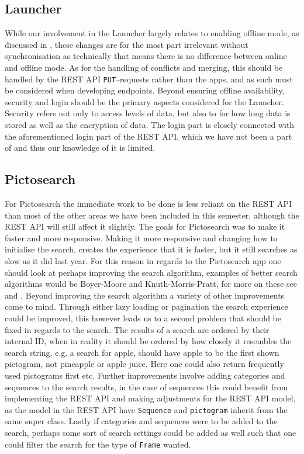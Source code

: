 \subsection*{Launcher}
While our involvement in the Launcher largely relates to enabling offline mode, as discussed in , these changes are for the most part irrelevant without synchronisation as technically that means there is no difference between online and offline mode.
As for the handling of conflicts and merging, this should be handled by the REST API \texttt{PUT}--requests rather than the apps, and as such must be considered when developing endpoints.
Beyond ensuring offline availability, security and login should be the primary aspects considered for the Launcher.
Security refers not only to access levels of data, but also to for how long data is stored as well as the encryption of data.
The login part is closely connected with the aforementioned login part of the REST API, which we have not been a part of and thus our knowledge of it is limited.

\subsection*{Pictosearch}
For Pictosearch the immediate work to be done is less reliant on the REST API than most of the other areas we have been included in this semester, although the REST API will still affect it slightly.
The goals for Pictosearch was to make it faster and more responsive.
Making it more responsive and changing how to initialise the search, creates the experience that it is faster, but it still searches as slow as it did last year.
For this reason in regards to the Pictosearch app one should look at perhaps improving the search algorithm, examples of better search algorithms would be Boyer-Moore and Knuth-Morris-Pratt, for more on these see \cite{BoyerMoore} and \cite{KnuthMorrisPratt}.
Beyond improving the search algorithm a variety of other improvements come to mind.
Through either lazy loading or pagination the search experience could be improved, this however leads us to a second problem that should be fixed in regards to the search.
The results of a search are ordered by their internal ID, when in reality it should be ordered by how closely it resembles the search string, e.g. a search for apple, should have apple to be the first shown pictogram, not pineapple or apple juice.
Here one could also return frequently used pictograms first etc.
Further improvements involve adding categories and sequences to the search results, in the case of sequences this could benefit from implementing the REST API and making adjustments for the REST API model, as the model in the REST API have \texttt{Sequence} and \texttt{pictogram} inherit from the same super class.
Lastly if categories and sequences were to be added to the search, perhaps some sort of search settings could be added as well such that one could filter the search for the type of \texttt{Frame} wanted.

